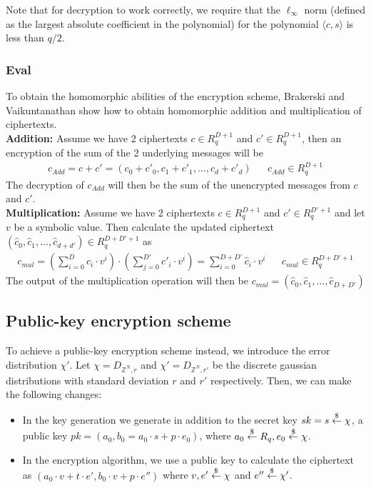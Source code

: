 \documentclass[../main.tex]{subfiles}
\begin{document}
Note that for decryption to work correctly, we require that the $\ell_\infty$ norm (defined as the largest absolute coefficient in the polynomial) for the polynomial $\langle c, s \rangle$ is less than $q / 2$.

\subsubsection{Eval}
To obtain the homomorphic abilities of the encryption scheme, Brakerski and Vaikuntanathan show
how to obtain homomorphic addition and multiplication of ciphertexts.
\\[2mm]
\textbf{Addition:} Assume we have 2 ciphertexts $c \in R_q^{D+1}$ and $c' \in R_q^{D+1}$, then an encryption
of the sum of the 2 underlying messages will be
\begin{align*}
    c_{Add} = c + c' = (c_0 + c'_0, c_1 + c'_1, \dots , c_d + c'_d) &  & c_{Add} \in R_q^{D + 1}
\end{align*}
The decryption of $c_{Add}$ will then be the sum of the unencrypted messages from $c$ and $c'$.
\\[2mm]
\textbf{Multiplication:} Assume we have 2 ciphertexts $c \in R_q^{D+1}$ and $c' \in R_q^{D'+1}$ and let $v$ be a symbolic value.
Then calculate the updated ciphertext $(\hat{c}_0, \hat{c}_1, \dots, \hat{c}_{d+d'}) \in R_q^{D + D' + 1}$ as
\begin{align*}
    c_{mul} = (\sum_{i=0}^D c_i \cdot v^i) \cdot
    (\sum_{j=0}^{D'} c'_i \cdot v^i) =
    \sum_{i=0}^{D+D'} \hat{c}_i \cdot v^i
     &  & c_{mul} \in R_q^{D+D'+1}
\end{align*}
The output of the multiplication operation will then be $c_{mul} = (\hat{c}_0, \hat{c}_1, \dots, \hat{c}_{D+D'})$

\subsection{Public-key encryption scheme}
To achieve a public-key encryption scheme instead, we introduce the error distribution $\chi '$.
Let $\chi = D_{\mathbb{Z}^N, r}$ and $\chi' = D_{\mathbb{Z}^N, r'}$ be the discrete gaussian distributions with standard deviation $r$ and $r'$ respectively.
Then, we can make the following changes:
\begin{itemize}
    \item In the key generation we generate in addition to the secret key $sk = s \overset{\$}{\gets}{} \chi$, a public key
        $pk = (a_0 , b_0 = a_0 \cdot s + p \cdot e_0)$, where $a_0 \overset{\$}{\gets}{} R_q, e_0 \overset{\$}{\gets}{} \chi$.
    \item In the encryption algorithm, we use a public key to calculate the ciphertext as
        $(a_0 \cdot v + t \cdot e', b_0 \cdot v + p \cdot e'')$ where
        $v, e' \overset{\$}{\gets}{} \chi$ and $e'' \overset{\$}{\gets}{} \chi '$.
\end{itemize}
\end{document}
